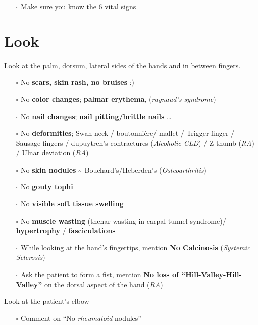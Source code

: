 \documentclass[
  13.5pt,
  a4paper,
  DIV=11,
  numbers=noendperiod]{scrreprt}
\providecommand{\tightlist}{%
  \setlength{\itemsep}{0pt}\setlength{\parskip}{0pt}}
\begin{document}
\begin{itemize}
\tightlist
\item[$\square$]
  Make sure you know the \href{miscellaneous.qmd}{6 vital signs}
\end{itemize}


\chapter{Look}\label{look}

Look at the palm, dorsum, lateral sides of the hands and in between
fingers.

\begin{itemize}
\tightlist
\item[$\square$]
  No \textbf{scars, skin rash, no bruises} :)
\item[$\square$]
  No \textbf{color changes}; \textbf{palmar erythema}, (\emph{raynaud's
  syndrome})
\item[$\square$]
  No \textbf{nail changes}; \textbf{nail pitting/brittle nails} \ldots{}
\item[$\square$]
  No \textbf{deformities}; Swan neck / boutonnière/ mallet / Trigger
  finger / Sausage fingers / dupuytren's contractures
  (\emph{Alcoholic-CLD}) / Z thumb (\emph{RA}) / Ulnar deviation
  (\emph{RA})
\item[$\square$]
  No \textbf{skin nodules} \textasciitilde{} Bouchard's/Heberden's
  (\emph{Osteoarthritis})
\item[$\square$]
  No \textbf{gouty tophi}
\item[$\square$]
  No \textbf{visible soft tissue swelling}
\item[$\square$]
  No \textbf{muscle wasting} (thenar wasting in carpal tunnel syndrome)/
  \textbf{hypertrophy} / \textbf{fasciculations}
\item[$\square$]
  While looking at the hand's fingertips, mention \textbf{No Calcinosis}
  (\emph{Systemic Sclerosis})
\item[$\square$]
  Ask the patient to form a fist, mention \textbf{No loss of
  ``Hill-Valley-Hill-Valley''} on the dorsal aspect of the hand
  (\emph{RA})
\end{itemize}

Look at the patient's elbow

\begin{itemize}
\tightlist
\item[$\square$]
  Comment on ``No \emph{rheumatoid} nodules''
\end{itemize}
\end{document}
